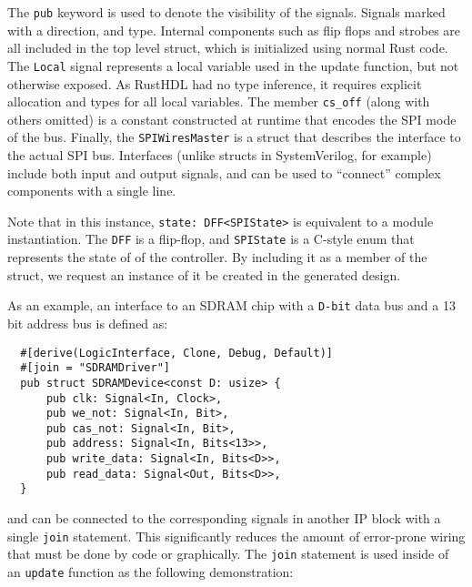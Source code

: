 \documentclass[sigplan,screen,sigconf]{acmart}
\begin{document}
The \verb|pub| keyword is used to denote the visibility of the signals.  Signals 
marked with a direction, and type.  Internal components such as flip flops and strobes
are all included in the top level struct, which is initialized using normal Rust code.
The \verb|Local| signal represents a local variable used in the update function, but
not otherwise exposed.  As RustHDL had no type inference, it requires explicit allocation
and types for all local variables.  The member \verb|cs_off| (along with others omitted) is a  
constant constructed at runtime that encodes the SPI mode of the bus.  Finally, 
the \verb|SPIWiresMaster| is a struct that describes the interface to the actual SPI bus.
Interfaces (unlike structs in SystemVerilog, for example) include both input and output
signals, and can be used to ``connect'' complex components with a single line.  

Note that in this instance, \verb|state: DFF<SPIState>| is equivalent to a module instantiation.
The \verb|DFF| is a flip-flop, and \verb|SPIState| is a C-style enum that represents the state of
of the controller.  By including it as a member of the struct, we request an instance of it be
created in the generated design.

As an example, an interface to an SDRAM chip with a \verb|D-bit| data bus and a 13 bit 
address bus is defined as:

\begin{verbatim}
  #[derive(LogicInterface, Clone, Debug, Default)]
  #[join = "SDRAMDriver"]
  pub struct SDRAMDevice<const D: usize> {
      pub clk: Signal<In, Clock>,
      pub we_not: Signal<In, Bit>,
      pub cas_not: Signal<In, Bit>,
      pub address: Signal<In, Bits<13>>,
      pub write_data: Signal<In, Bits<D>>,
      pub read_data: Signal<Out, Bits<D>>,
  }
\end{verbatim}

and can be connected to the corresponding signals in another IP block with a single \verb|join|
statement.  This significantly reduces the amount of error-prone wiring that must be done
by code or graphically.  The \verb|join| statement is used inside of an \verb|update| function as the
following demonstration:
\end{document}
